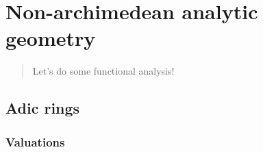 \chapter{Non-archimedean analytic geometry} \label{chapter: valuations} 
    \begin{abstract}
        Let's do some functional analysis!
    \end{abstract}
    
    \minitoc
    
    \section{Adic rings}
        \subsection{Valuations}
